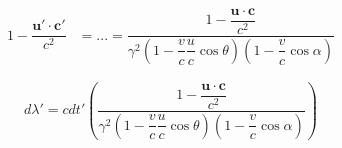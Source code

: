 \begin{equation}
	\begin{aligned}
		1 - \dfrac{\mathbf{u}' \cdot \mathbf{c}'}{c^2} & = ...
		= \dfrac{  1 - \dfrac{\mathbf{u}\cdot\mathbf{c}}{c^2}  }
		{ \gamma^2 \left(1-\dfrac{v}{c}\dfrac{u}{c}\cos\theta \right) \left(1-\dfrac{v}{c}\cos\alpha \right)}
	\end{aligned}
\end{equation}

\begin{equation}
	d\lambda' = c dt' \left( \dfrac{  1 - \dfrac{\mathbf{u}\cdot\mathbf{c}}{c^2}  }
	{ \gamma^2 \left(1-\dfrac{v}{c}\dfrac{u}{c}\cos\theta \right) \left(1-\dfrac{v}{c}\cos\alpha \right)} \right)
\end{equation}

